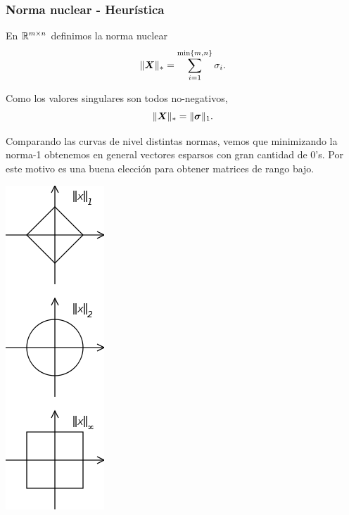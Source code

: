 \documentclass[aspectratio=169,12pt,spanish]{beamer}
\begin{document}
\begin{frame}
\frametitle{Norma nuclear - Heurística}

\begin{minipage}[c]{0.7\textwidth}
En $\mathbb{R}^{m \times n}$ definimos la norma nuclear
$$
\| \bm{X} \|_* = \sum_{i=1}^{\min\{m, n\}} \sigma_i.
$$

Como los valores singulares son todos no-negativos,
$$
\| \bm{X} \|_* = \| \bm{\sigma} \|_1.
$$

Comparando las curvas de nivel distintas normas, vemos que minimizando la norma-1 obtenemos en general vectores esparsos con gran cantidad de 0's. Por este motivo es una buena elección para obtener matrices de rango bajo.
\end{minipage}
\begin{minipage}[c]{0.25\textwidth}
\begin{center}
\includegraphics[scale=.4]{140px-Vector_norms.png}
\end{center}
\end{minipage}

\end{frame}

\end{document}
